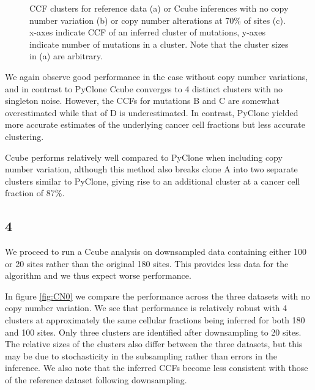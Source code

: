 \documentclass{article}
\begin{document}
\begin{figure}[h]
\begin{subfigure}[t]{0.32\linewidth}
	\end{subfigure}%
\caption{CCF clusters for reference data (a) or Ccube inferences with no copy number variation (b) or copy number alterations at 70\% of sites (c). x-axes indicate CCF of an inferred cluster of mutations, y-axes indicate number of mutations in a cluster. Note that the cluster sizes in (a) are arbitrary.}
\label{fig:ccube}
\end{figure}

\newpage

We again observe good performance in the case without copy number variations, and in contrast to PyClone Ccube converges to 4 distinct clusters with no singleton noise. However, the CCFs for mutations B and C are somewhat overestimated while that of D is underestimated. In contrast, PyClone yielded more accurate estimates of the underlying cancer cell fractions but less accurate clustering.

Ccube performs relatively well compared to PyClone when including copy number variation, although this method also breaks clone A into two separate clusters similar to PyClone, giving rise to an additional cluster at a cancer cell fraction of 87\%.

\subsection*{4}

We proceed to run a Ccube analysis on downsampled data containing either 100 or 20 sites rather than the original 180 sites. This provides less data for the algorithm and we thus expect worse performance.

In figure \ref{fig:CN0} we compare the performance across the three datasets with no copy number variation. We see that performance is relatively robust with 4 clusters at approximately the same cellular fractions being inferred for both 180 and 100 sites. Only three clusters are identified after downsampling to 20 sites. The relative sizes of the clusters also differ between the three datasets, but this may be due to stochasticity in the subsampling rather than errors in the inference. We also note that the inferred CCFs become less consistent with those of the reference dataset following downsampling.
\end{document}
